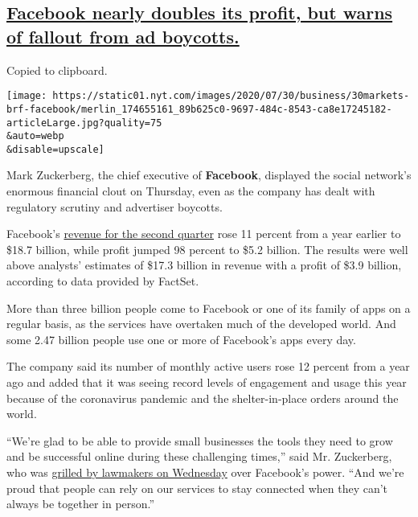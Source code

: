 \hypertarget{facebook-nearly-doubles-its-profit-but-warns-of-fallout-from-ad-boycotts}{%
\subsection{\texorpdfstring{\protect\hyperlink{facebook-nearly-doubles-its-profit-but-warns-of-fallout-from-ad-boycotts}{Facebook
nearly doubles its profit, but warns of fallout from ad
boycotts.}}{Facebook nearly doubles its profit, but warns of fallout from ad boycotts.}}\label{facebook-nearly-doubles-its-profit-but-warns-of-fallout-from-ad-boycotts}}

Copied to clipboard.

\texttt{[image: https://static01.nyt.com/images/2020/07/30/business/30markets-brf-facebook/merlin\_174655161\_89b625c0-9697-484c-8543-ca8e17245182-articleLarge.jpg?quality=75\\\&auto=webp\\\&disable=upscale]}

Mark Zuckerberg, the chief executive of \textbf{Facebook}, displayed the
social network's enormous financial clout on Thursday, even as the
company has dealt with regulatory scrutiny and advertiser boycotts.

Facebook's
\href{https://investor.fb.com/investor-news/press-release-details/2020/Facebook-Reports-Second-Quarter-2020-Results/default.aspx}{revenue
for the second quarter} rose 11 percent from a year earlier to \$18.7
billion, while profit jumped 98 percent to \$5.2 billion. The results
were well above analysts' estimates of \$17.3 billion in revenue with a
profit of \$3.9 billion, according to data provided by FactSet.

More than three billion people come to Facebook or one of its family of
apps on a regular basis, as the services have overtaken much of the
developed world. And some 2.47 billion people use one or more of
Facebook's apps every day.

The company said its number of monthly active users rose 12 percent from
a year ago and added that it was seeing record levels of engagement and
usage this year because of the coronavirus pandemic and the
shelter-in-place orders around the world.

``We're glad to be able to provide small businesses the tools they need
to grow and be successful online during these challenging times,'' said
Mr. Zuckerberg, who was
\href{https://www.nytimes.com/2020/07/29/technology/big-tech-hearing-apple-amazon-facebook-google.html}{grilled
by lawmakers on Wednesday} over Facebook's power. ``And we're proud that
people can rely on our services to stay connected when they can't always
be together in person.''

